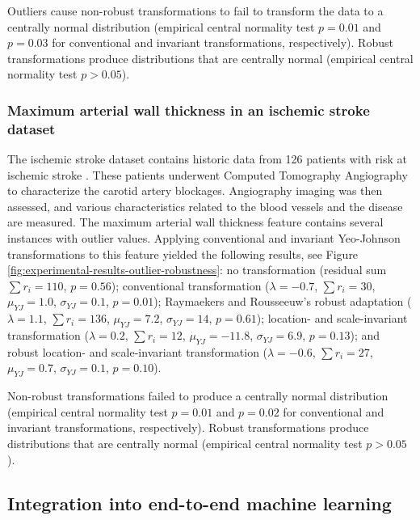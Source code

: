 \documentclass[preprint,12pt,authoryear]{elsarticle}
\begin{document}
Outliers cause non-robust transformations to fail to transform the data
to a centrally normal distribution (empirical central normality test
\(p = 0.01\) and \(p=0.03\) for conventional and invariant
transformations, respectively). Robust transformations produce
distributions that are centrally normal (empirical central normality
test \(p > 0.05\)).

\subsubsection{Maximum arterial wall thickness in an ischemic stroke
dataset}\label{sec:maximum-arterial-wall-thickness-in-an-ischemic-stroke-dataset}

The ischemic stroke dataset contains historic data from 126 patients
with risk at ischemic stroke \citep{Kuhn2019-kt}. These patients
underwent Computed Tomography Angiography to characterize the carotid
artery blockages. Angiography imaging was then assessed, and various
characteristics related to the blood vessels and the disease are
measured. The maximum arterial wall thickness feature contains several
instances with outlier values. Applying conventional and invariant
Yeo-Johnson transformations to this feature yielded the following
results, see Figure \ref{fig:experimental-results-outlier-robustness}:
no transformation (residual sum \(\sum r_i = 110\), \(p=0.56\));
conventional transformation (\(\lambda = -0.7\), \(\sum r_i = 30\),
\(\mu_{YJ} = 1.0\), \(\sigma_{YJ} = 0.1\), \(p=0.01\)); Raymaekers and
Rousseeuw's robust adaptation (\(\lambda = 1.1\), \(\sum r_i = 136\),
\(\mu_{YJ} = 7.2\), \(\sigma_{YJ} = 14\), \(p=0.61\)); location- and
scale-invariant transformation (\(\lambda = 0.2\), \(\sum r_i = 12\),
\(\mu_{YJ} = -11.8\), \(\sigma_{YJ} = 6.9\), \(p=0.13\)); and robust
location- and scale-invariant transformation (\(\lambda = -0.6\),
\(\sum r_i = 27\), \(\mu_{YJ} = 0.7\), \(\sigma_{YJ} = 0.1\),
\(p=0.10\)).

Non-robust transformations failed to produce a centrally normal
distribution (empirical central normality test \(p=0.01\) and \(p=0.02\)
for conventional and invariant transformations, respectively). Robust
transformations produce distributions that are centrally normal
(empirical central normality test \(p > 0.05\)).

\subsection{Integration into end-to-end machine
learning}\label{integration-into-end-to-end-machine-learning}
\end{document}

